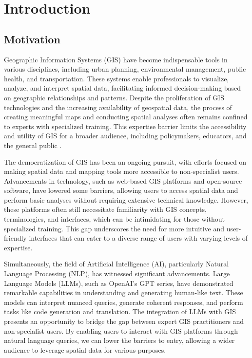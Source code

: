 
%

\chapter{Introduction}
\label{cha:introduction}

\section{Motivation}

Geographic Information Systems (GIS) have become indispensable tools in various disciplines, including urban planning, environmental management, public health, and transportation. These systems enable professionals to visualize, analyze, and interpret spatial data, facilitating informed decision-making based on geographic relationships and patterns. Despite the proliferation of GIS technologies and the increasing availability of geospatial data, the process of creating meaningful maps and conducting spatial analyses often remains confined to experts with specialized training. This expertise barrier limits the accessibility and utility of GIS for a broader audience, including policymakers, educators, and the general public \cite{haklay_neogeography_2013}.

The democratization of GIS has been an ongoing pursuit, with efforts focused on making spatial data and mapping tools more accessible to non-specialist users. Advancements in technology, such as web-based GIS platforms and open-source software, have lowered some barriers, allowing users to access spatial data and perform basic analyses without requiring extensive technical knowledge. However, these platforms often still necessitate familiarity with GIS concepts, terminologies, and interfaces, which can be intimidating for those without specialized training. This gap underscores the need for more intuitive and user-friendly interfaces that can cater to a diverse range of users with varying levels of expertise.

Simultaneously, the field of Artificial Intelligence (AI), particularly Natural Language Processing (NLP), has witnessed significant advancements. Large Language Models (LLMs), such as OpenAI's GPT series, have demonstrated remarkable capabilities in understanding and generating human-like text. These models can interpret nuanced queries, generate coherent responses, and perform tasks like code generation and translation. The integration of LLMs with GIS presents an opportunity to bridge the gap between expert GIS practitioners and non-specialist users. By enabling users to interact with GIS platforms through natural language queries, we can lower the barriers to entry, allowing a wider audience to leverage spatial data for various purposes.

